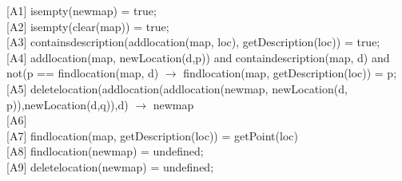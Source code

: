 \documentclass[12pt]{article}
\begin{document}
\begin{spacing}{1.5}
\hspace*{5mm} [A1] isempty(newmap) = true;\\
\hspace*{5mm} [A2] isempty(clear(map)) = true;\\
\hspace*{5mm} [A3] containsdescription(addlocation(map, loc), getDescription(loc)) = true;\\
\hspace*{5mm} [A4] addlocation(map, newLocation(d,p)) and containdescription(map, d) and not(p == findlocation(map, d) $\rightarrow$ findlocation(map, getDescription(loc)) = p;\\
\hspace*{5mm} [A5] deletelocation(addlocation(addlocation(newmap, newLocation(d, p)),newLocation(d,q)),d) $\rightarrow$ newmap\\
\hspace*{5mm} [A6] \\
\hspace*{5mm} [A7] findlocation(map, getDescription(loc)) = getPoint(loc)\\
\hspace*{5mm} [A8] findlocation(newmap) = undefined;\\
\hspace*{5mm} [A9] deletelocation(newmap) = undefined;\\

\end{spacing}
\end{document}
